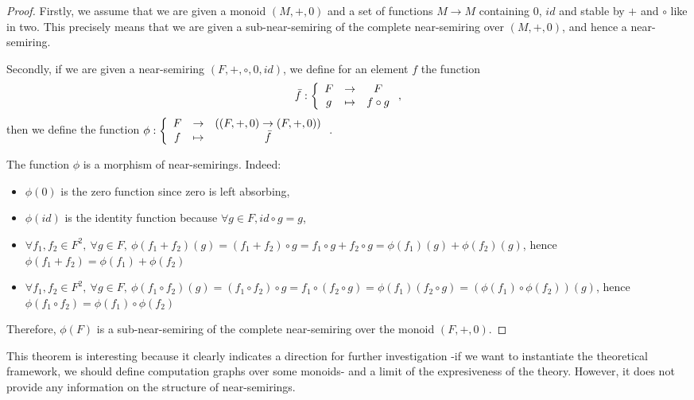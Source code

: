 \documentclass[11pt,a4paper]{article}
\theoremstyle{definition}
\begin{document}
\begin{proof}

	Firstly, we assume that we are given a monoid $(M,+,0)$ and a set of functions $M \to M$ containing $0$, $id$ and stable by $+$ and $\circ$ like in two. This precisely means that we are given a sub-near-semiring of the complete near-semiring over $(M,+,0)$, and hence a near-semiring.
	
	Secondly, if we are given a near-semiring $(F,+,\circ,0,id)$, we define for an element $f$ the function 
	$$\bar{f} : \left\{ 
	\begin{array}{c c c}
		F & \to & F \\
		g & \mapsto & f \circ g
	\end{array} \right. ,$$
	then we define the function $\phi : \left\{ 
	\begin{array}{c c c}
		F & \to & ((F,+,0) \to (F,+,0)) \\
		f & \mapsto & \bar{f}
	\end{array} \right.$. 
	
	The function $\phi$ is a morphism of near-semirings. Indeed: 
	\begin{itemize}
	
		\item $\phi(0)$ is the zero function since zero is left absorbing,
		
		\item $\phi(id)$ is the identity function because $\forall g \in F,id \circ g= g$,
		
		\item $\forall f_1,f_2 \in F^2,\ \forall g \in F,\ \phi(f_1 + f_2)(g)=(f_1 + f_2) \circ g = f_1 \circ g + f_2 \circ g = \phi(f_1)(g) + \phi (f_2)(g)$, hence $\phi(f_1+f_2)=\phi(f_1)+\phi(f_2)$
		
		\item $\forall f_1,f_2 \in F^2,\ \forall g \in F,\ \phi(f_1 \circ f_2)(g)=(f_1 \circ f_2) \circ g = f_1 \circ (f_2 \circ g) = \phi(f_1)(f_2 \circ g) = (\phi(f_1) \circ \phi(f_2))(g) $, hence $\phi(f_1 \circ f_2)=\phi(f_1) \circ \phi(f_2)$
	
	\end{itemize}
	Therefore, $\phi(F)$ is a sub-near-semiring of the complete near-semiring over the monoid $(F,+,0)$.

\end{proof}

	This theorem is interesting because it clearly indicates a direction for further investigation -if we want to instantiate the theoretical framework, we should define computation graphs over some monoids- and a limit of the expresiveness of the theory. However, it does not provide any information on the structure of near-semirings.
\end{document}

